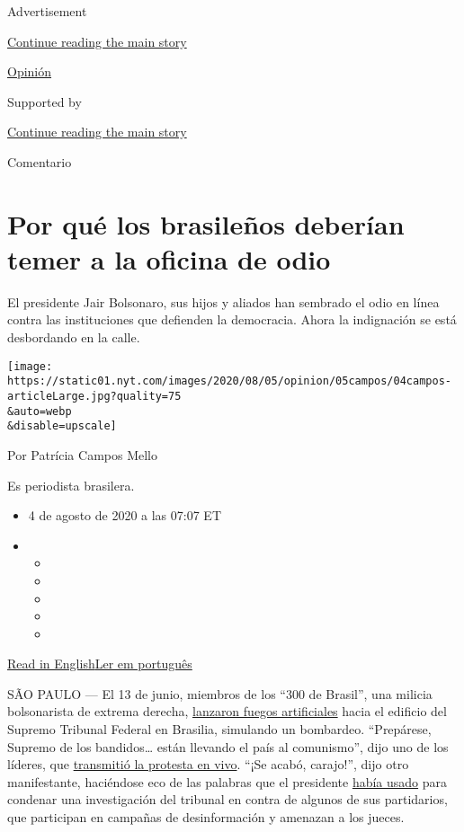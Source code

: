 Advertisement

\protect\hyperlink{after-top}{Continue reading the main story}

\href{/es/section/opinion}{Opinión}

Supported by

\protect\hyperlink{after-sponsor}{Continue reading the main story}

Comentario

\hypertarget{por-quuxe9-los-brasileuxf1os-deberuxedan-temer-a-la-oficina-de-odio}{%
\section{Por qué los brasileños deberían temer a la oficina de
odio}\label{por-quuxe9-los-brasileuxf1os-deberuxedan-temer-a-la-oficina-de-odio}}

El presidente Jair Bolsonaro, sus hijos y aliados han sembrado el odio
en línea contra las instituciones que defienden la democracia. Ahora la
indignación se está desbordando en la calle.

\texttt{[image: https://static01.nyt.com/images/2020/08/05/opinion/05campos/04campos-articleLarge.jpg?quality=75\\\&auto=webp\\\&disable=upscale]}

Por Patrícia Campos Mello

Es periodista brasilera.

\begin{itemize}
\item
  4 de agosto de 2020 a las 07:07 ET
\item
  \begin{itemize}
  \item
  \item
  \item
  \item
  \item
  \end{itemize}
\end{itemize}

\href{https://www.nytimes.com/2020/08/04/opinion/bolsonaro-office-of-hate-brazil.html}{Read
in
English}\href{https://www.nytimes.com/pt/2020/08/04/opinion/international-world/bolsonaro-gabinete-do-odio.html}{Ler
em português}

SÃO PAULO --- El 13 de junio, miembros de los ``300 de Brasil'', una
milicia bolsonarista de extrema derecha,
\href{https://www1.folha.uol.com.br/poder/2020/05/sara-winter-xinga-moraes-diz-querer-trocar-socos-com-ele-e-promete-inferniza-lo.shtml}{lanzaron
fuegos artificiales} hacia el edificio del Supremo Tribunal Federal en
Brasilia, simulando un bombardeo. ``Prepárese, Supremo de los
bandidos\ldots{} están llevando el país al comunismo'', dijo uno de los
líderes, que
\href{https://www.metropoles.com/brasil/video-bolsonaristas-lancam-fogos-de-artificio-em-predio-do-stf}{transmitió
la protesta en vivo}. ``¡Se acabó, carajo!'', dijo otro manifestante,
haciéndose eco de las palabras que el presidente
\href{https://www.youtube.com/watch?v=I2bZoC8FHJI}{había usado} para
condenar una investigación del tribunal en contra de algunos de sus
partidarios, que participan en campañas de desinformación y amenazan a
los jueces.

